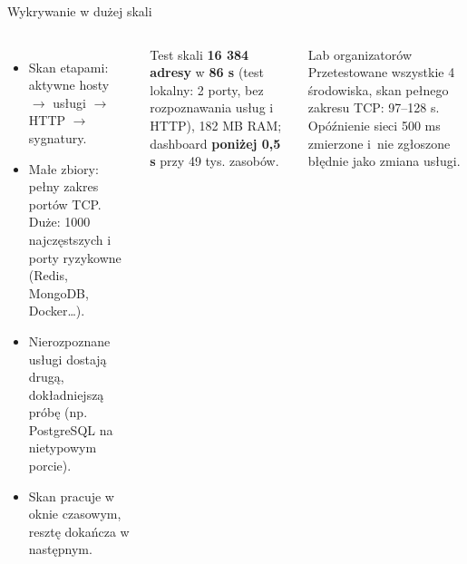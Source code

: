 \documentclass[aspectratio=169,11pt]{beamer}
\begin{document}
\begin{frame}{Wykrywanie w dużej skali}
  \begin{columns}[T]
    \begin{itemize}\small
      \item Skan etapami: aktywne hosty $\rightarrow$ usługi $\rightarrow$ HTTP $\rightarrow$ sygnatury.
      \item Małe zbiory: pełny zakres portów TCP. Duże: 1000 najczęstszych i porty ryzykowne (Redis, MongoDB, Docker…).
      \item Nierozpoznane usługi dostają drugą, dokładniejszą próbę (np. PostgreSQL na nietypowym porcie).
      \item Skan pracuje w oknie czasowym, resztę dokańcza w następnym.
    \end{itemize}
    \begin{block}{Test skali}
      \small
      \textbf{16 384 adresy} w \textbf{86 s} (test lokalny: 2 porty, bez rozpoznawania usług i HTTP), 182 MB RAM;
      dashboard \textbf{poniżej 0,5 s} przy 49 tys. zasobów.
    \end{block}
    \begin{block}{Lab organizatorów}
      \small
Przetestowane wszystkie 4 środowiska, skan pełnego zakresu TCP: 97--128 s.
      Opóźnienie sieci 500 ms zmierzone i~nie zgłoszone błędnie jako zmiana usługi.
    \end{block}
  \end{columns}
\end{frame}
\end{document}
